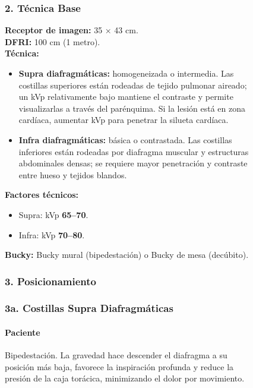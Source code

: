 \begin{figure}
{%
\subsubsection*{2. Técnica Base}

\textbf{Receptor de imagen:} 35 × 43 cm.\\

\textbf{DFRI:} 100 cm (1 metro).\\

\textbf{Técnica:}
\begin{itemize}
  \item \textbf{Supra diafragmáticas:} homogeneizada o intermedia. Las costillas superiores están rodeadas de tejido pulmonar aireado; un kVp relativamente bajo mantiene el contraste y permite visualizarlas a través del parénquima. Si la lesión está en zona cardíaca, aumentar kVp para penetrar la silueta cardíaca.
  \item \textbf{Infra diafragmáticas:} básica o contrastada. Las costillas inferiores están rodeadas por diafragma muscular y estructuras abdominales densas; se requiere mayor penetración y contraste entre hueso y tejidos blandos.
\end{itemize}

\textbf{Factores técnicos:}
\begin{itemize}
  \item Supra: kVp \textbf{65--70}.
  \item Infra: kVp \textbf{70--80}.
\end{itemize}

\textbf{Bucky:} Bucky mural (bipedestación) o Bucky de mesa (decúbito).

\subsubsection*{3. Posicionamiento}

\subsubsection*{\small 3a. Costillas Supra Diafragmáticas}

\paragraph*{Paciente}
Bipedestación. La gravedad hace descender el diafragma a su posición más baja, favorece la inspiración profunda y reduce la presión de la caja torácica, minimizando el dolor por movimiento.

}
\end{figure}
